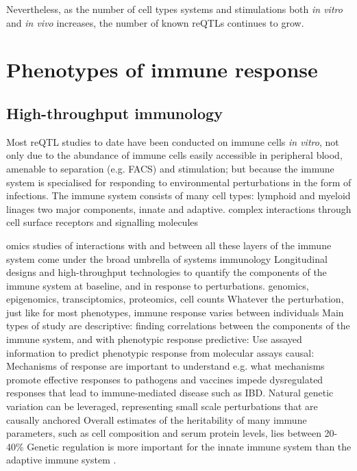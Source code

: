 \begin{outline}
    \2 Nevertheless, as the number of cell types systems and stimulations both \textit{in vitro} and \textit{in vivo} increases, the number of known reQTLs continues to grow.

\section{Phenotypes of immune response}

\subsection{High-throughput immunology}

\1 Most \gls{reQTL} studies to date have been conducted on immune cells \textit{in vitro}, 
not only due to the abundance of immune cells easily accessible in peripheral blood, amenable to separation (e.g. FACS) and stimulation;
but because the immune system is specialised for responding to environmental perturbations in the form of infections.
    \2 The immune system consists of many cell types: lymphoid and myeloid linages
    \2 two major components, innate and adaptive.
    \2 complex interactions through cell surface receptors and signalling molecules

\1 omics studies of interactions with and between all these layers of the immune system come under the broad umbrella of systems immunology
    \2 Longitudinal designs and high-throughput technologies to quantify the components of the immune system at baseline, and in response to perturbations.
        \3 genomics, epigenomics, transciptomics, proteomics, cell counts
    \2 Whatever the perturbation, just like for most phenotypes, immune response varies between individuals
    \2 Main types of study are descriptive:
        \3 finding correlations between the components of the immune system, and with phenotypic response
    \2 predictive:
        \3 Use assayed information to predict phenotypic response from molecular assays
    \2 causal:
        \3 Mechanisms of response are important to understand e.g. 
            \4 what mechanisms promote effective responses to pathogens and vaccines
            \4 impede dysregulated responses that lead to immune-mediated disease such as IBD.
    \2 Natural genetic variation can be leveraged, representing small scale perturbations that are causally anchored \autocite{tsang2015UtilizingPopulationVariation,villani2018SystemsImmunologyLearning}
        \3 Overall estimates of the heritability of many immune parameters, such as cell composition and serum protein levels, lies between 20-40\% \autocite{liston2016ShapingVariationHuman,brodin2017HumanImmuneSystem,patin2018NaturalVariationParameters,liston2018OriginsDiversityHuman}
        \3 Genetic regulation is more important for the innate immune system than the adaptive immune system \autocite{patin2018NaturalVariationParameters}.


\end{outline}

